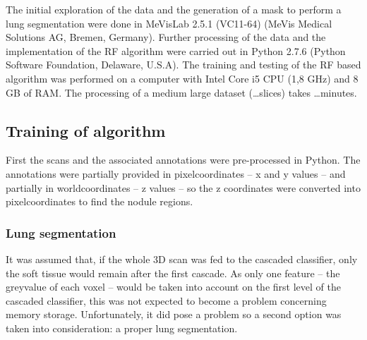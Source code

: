 The initial exploration of the data and the generation of a mask to perform a
lung segmentation were done in MeVisLab 2.5.1 (VC11-64) (MeVis Medical Solutions
AG, Bremen, Germany). Further processing of the data and the implementation of
the RF algorithm were carried out in Python 2.7.6 (Python Software Foundation,
Delaware, U.S.A).  The training and testing of the RF based algorithm was
performed on a computer with Intel Core i5 CPU (1,8 GHz) and 8 GB of RAM. The
processing of a medium large dataset (\ldots slices) takes \ldots minutes.

\subsection{Training of algorithm}
First the scans and the associated annotations were pre-processed in Python. The
annotations were partially provided in pixelcoordinates -- x and y values -- and
partially in worldcoordinates -- z values -- so the z coordinates were converted
into pixelcoordinates to find the nodule regions.

\subsubsection{Lung segmentation}
It was assumed that, if the whole 3D scan was fed to the cascaded classifier,
only the soft tissue would remain after the first cascade. As only one feature
-- the greyvalue of each voxel -- would be taken into account on the first level
of the cascaded classifier, this was not expected to become a problem concerning
memory storage. Unfortunately, it did pose a problem so a second option was
taken into consideration: a proper lung segmentation.

